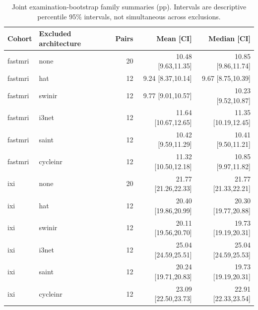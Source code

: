 \begin{table}[t]\centering\scriptsize
\caption{Joint examination-bootstrap family summaries (pp). Intervals are descriptive percentile 95\% intervals, not simultaneous across exclusions.}
\label{tab:family-robustness}\setlength{\tabcolsep}{4pt}
\begin{tabular}{llrrr}\toprule Cohort & Excluded architecture & Pairs & Mean [CI] & Median [CI]\\\midrule
fastmri & none & 20 & 10.48 [9.63,11.35] & 10.85 [9.86,11.74] \\
fastmri & hat & 12 & 9.24 [8.37,10.14] & 9.67 [8.75,10.39] \\
fastmri & swinir & 12 & 9.77 [9.01,10.57] & 10.23 [9.52,10.87] \\
fastmri & i3net & 12 & 11.64 [10.67,12.65] & 11.35 [10.19,12.45] \\
fastmri & saint & 12 & 10.42 [9.59,11.29] & 10.41 [9.50,11.21] \\
fastmri & cycleinr & 12 & 11.32 [10.50,12.18] & 10.85 [9.97,11.82] \\
ixi & none & 20 & 21.77 [21.26,22.33] & 21.77 [21.33,22.21] \\
ixi & hat & 12 & 20.40 [19.86,20.99] & 20.30 [19.77,20.88] \\
ixi & swinir & 12 & 20.11 [19.56,20.70] & 19.73 [19.19,20.31] \\
ixi & i3net & 12 & 25.04 [24.59,25.51] & 25.04 [24.59,25.53] \\
ixi & saint & 12 & 20.24 [19.71,20.83] & 19.73 [19.19,20.31] \\
ixi & cycleinr & 12 & 23.09 [22.50,23.73] & 22.91 [22.33,23.54] \\
\bottomrule\end{tabular}\end{table}